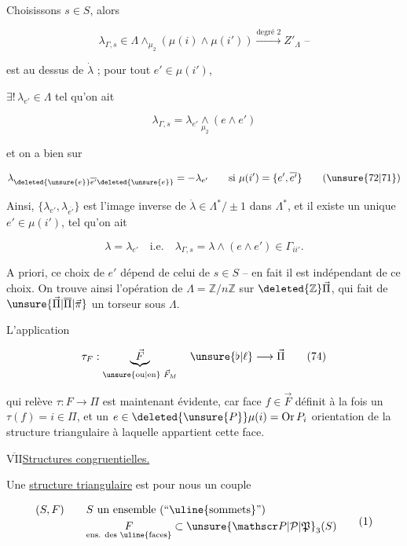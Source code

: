 Choisissons $s\in S$, alors

\[
\lambda_{\Gamma,s}\in\Lambda\wedge_{\mu_2}(\mu(i)\wedge\mu(i'))\xrightarrow{\text{degré 2}} Z'_\Lambda\text{ --}
\]

est au dessus de $\dot\lambda$ ; pour tout $e'\in\mu(i')$,

$\exists!\,\lambda_{e'}\in\Lambda$ tel qu'on ait

\[
\lambda_{\Gamma,s}=\lambda_{e'}\underset{\mu_2}{\wedge}(e\wedge e')\tag*{(71)}
\]

et on a bien sur

\[
\lambda_{\deleted{\unsure{e}}\overline{e'}\deleted{\unsure{e}}}=-\lambda_{e'}\qquad\text{si }\mu(i')=\{e',\overline{e'}\}\tag*{(\unsure{72|71})}
\]

Ainsi, $\{\lambda_{e'},\lambda_{\overline{e'}}\}$ est l'image inverse de $\dot\lambda\in\Lambda^*/\pm1$ dans $\Lambda^*$, et il existe un unique $e'\in\mu(i')$, tel qu'on ait

\[
\lambda=\lambda_{e'}\quad\text{i.e.}\quad\lambda_{\Gamma,s}=\lambda\wedge(e\wedge e')\in\Gamma_{ii'}.\tag*{(73)}
\]

A priori, ce choix de $e'$ dépend de celui de $s\in S$ -- en fait il est indépendant de ce choix. On trouve ainsi l'opération de $\Lambda=\mathbb Z/n\mathbb Z$ sur $\deleted{\mathbb Z}\vec\Pi$, qui fait de $\unsure{\vec\Pi|\overline\Pi|\vec\pi}$ un torseur sous $\Lambda$.

L'application

\[
\tau_F:\underbrace{\vec F}_{\text{\unsure{ou|en} }\vec F_M}\quad\unsure{\flat|\ell}\longrightarrow\vec\Pi\tag*{(74)}
\]

qui relève $\tau:F\longrightarrow\Pi$ est maintenant évidente, car  face  $f\in\vec F$ définit à la fois un $\tau(f)=i\in\Pi$, et un $e\in\deleted{\unsure{P}}\mu(i)=\operatorname{Or}P_i$ orientation de la structure triangulaire à laquelle appartient cette face.

\uline{$\overline{\mathrm{VII}}$}\quad\uline{Structures  congruentielles.}

Une \uline{structure triangulaire} est pour nous un couple

\[
\begin{aligned}
 (S,F)\qquad&S\text{ un ensemble (``\uline{sommets}'')}\\
 &\underset{\text{ens. des \uline{faces}}}{F}\subset\unsure{\mathscr P|\mathcal P|\mathfrak P}_3(S)
\end{aligned}\tag*{(1)}
\]

